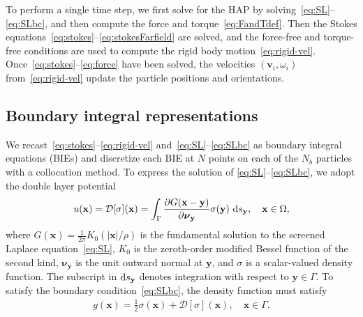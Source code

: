 \documentclass[prb,preprint,showpacs,preprintnumbers,amsmath,amssymb,longbibliography]{revtex4-1}
\newcommand{\DD}{\mathcal{D}}
\newcommand{\nnu}{\boldsymbol{\nu}}
\newcommand{\xx}{\mathbf{x}}
\renewcommand{\vv}{\mathbf{v}}
\newcommand{\yy}{\mathbf{y}}
\newcommand{\pderiv}[2]{\frac{\partial #1}{\partial #2}}
\begin{document}
To perform a single time step, we first solve for the HAP by
solving~\eqref{eq:SL}--\eqref{eq:SLbc}, and then compute the force and
torque~\eqref{eq:FandTdef}. Then the Stokes
equations~\eqref{eq:stokes}--\eqref{eq:stokesFarfield} are solved, and
the force-free and torque-free conditions are used to compute the rigid
body motion~\eqref{eq:rigid-vel}.
Once~\eqref{eq:stokes}--\eqref{eq:force} have been solved, the
velocities $(\vv_i, \omega_i)$ from~\eqref{eq:rigid-vel} update the
particle positions and orientations.


\subsection{Boundary integral representations}
We recast~\eqref{eq:stokes}--\eqref{eq:rigid-vel}
and~\eqref{eq:SL}--\eqref{eq:SLbc} as boundary integral equations (BIEs)
and discretize each BIE at $N$ points on each of the $N_b$ particles
with a collocation method. To express the solution of
\eqref{eq:SL}--\eqref{eq:SLbc}, we adopt the double layer potential
\begin{align}
\label{eq:SL_BIE}
u({\xx}) = \DD[\sigma](\xx) = \int_\Gamma 
  \pderiv{G(\xx-\yy)}{\nnu_\yy}\sigma(\yy)\, \dif s_\yy, 
  \quad \xx \in \Omega,
\end{align}
where $G(\xx) = \frac{1}{2\pi}K_0(|\xx|/\rho)$ is the fundamental
solution to the screened Laplace equation~\eqref{eq:SL}, $K_0$ is the
zeroth-order modified Bessel function of the second kind, $\nnu_\yy$ is
the unit outward normal at $\yy$, and $\sigma$ is a scalar-valued
density function. The subscript in $\dif s_\yy$ denotes integration with
respect to $\yy \in \Gamma$. To satisfy the boundary
condition~\eqref{eq:SLbc}, the density function must satisfy\cite{Hsiao2008}
\begin{align}
  \label{eq:SL_BIE2}
  g(\xx) = \frac{1}{2} \sigma(\xx) + \DD[\sigma](\xx), \quad
    \xx \in \Gamma.
\end{align}
\end{document}
